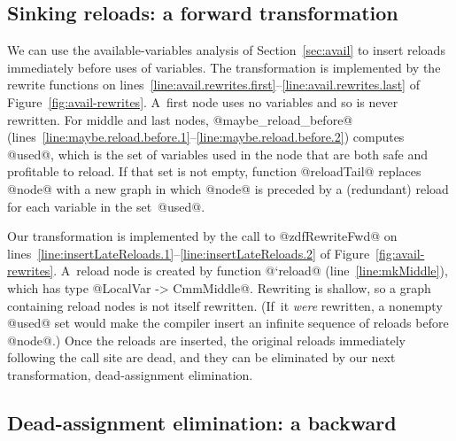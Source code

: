 \documentclass[blockstyle,preprint,natbib,nocopyrightspace]{sigplanconf}
\newcommand\lineref[1]{line~\ref{line:#1}}
\newcommand\linerangeref[2]{\mbox{lines~\ref{line:#1}--\ref{line:#2}}}
\def\finalremark#1{\relax}
\newcommand\secref[1]{Section~\ref{sec:#1}}
\newcommand\seclabel[1]{\label{sec:#1}}
\newcommand\figref[1]{Figure~\ref{fig:#1}}
\begin{document}
\subsection{Sinking reloads: a forward transformation}

\finalremark{Incidentally, I wonder if we should
use record notation when constructing @ForwardRewrites@?}

\seclabel{sink-reloads}

We can use the available-variables analysis of \secref{avail} to
insert reloads
immediately before uses of variables.
The transformation is implemented by the rewrite functions on
\linerangeref{avail.rewrites.first}{avail.rewrites.last} of \figref{avail-rewrites}.
A~first node uses no variables and so is never rewritten.
For middle and last nodes, @maybe_reload_before@ 
(\linerangeref{maybe.reload.before.1}{maybe.reload.before.2})
computes @used@, which is the set
of variables used in the node that are both safe and profitable to
reload. 
%
%
If that set is not empty, function
@reloadTail@ replaces @node@ with a new graph in which @node@ is
preceded by a (redundant) reload for each variable in the set~@used@.

Our transformation is implemented by the call to @zdfRewriteFwd@
on \linerangeref{insertLateReloads.1}{insertLateReloads.2} of \figref{avail-rewrites}.
A~reload node is created by function @`reload@ (\lineref{mkMiddle}),
which has type @LocalVar -> CmmMiddle@.
Rewriting is shallow, so a graph containing reload nodes
is not itself rewritten.
(If~it \emph{were} rewritten, a nonempty @used@ set would make the
compiler insert an infinite sequence of reloads before @node@.)
Once the reloads are inserted, the original reloads immediately
following the call site are dead, and they can be eliminated by our
next transformation, dead-assignment elimination.

\subsection{Dead-assignment elimination: a backward }


\seclabel{dead-code-elimination}
\seclabel{dead-code-elim}

\seclabel{bwd-rewrite}


\def\liveout{$\mathit{live_{out}}$}
\end{document}

